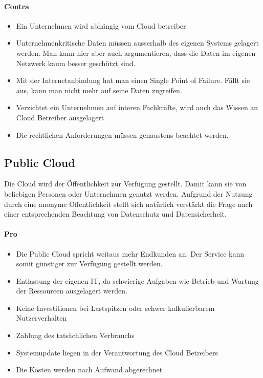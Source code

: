 \paragraph{Contra}
\begin{itemize}
	\item Ein Unternehmen wird abhängig vom Cloud betreiber
	\item Unternehmenkritische Daten müssen ausserhalb des eigenen Systems gelagert werden. Man kann hier aber auch argumentieren, dass die Daten im eigenen Netzwerk kaum besser geschützt sind.
	\item Mit der Internetanbindung hat man einen Single Point of Failure. Fällt sie aus, kann man nicht mehr auf seine Daten zugreifen.
	\item Verzichtet ein Unternehmen auf interen Fachkräfte, wird auch das Wissen an Cloud Betreiber ausgelagert
	\item Die rechtlichen Anforderungen müssen genaustens beachtet werden.
\end{itemize}


\subsection{Public Cloud}
Die Cloud wird der Öffentlichkeit zur Verfügung gestellt. Damit kann sie von beliebigen Personen oder Unternehmen genutzt werden. Aufgrund der Nutzung durch eine anonyme Öffentlichkeit stellt sich natürlich verstärkt die Frage nach einer entsprechenden Beachtung von Datenschutz und Datensicherheit.
\paragraph{Pro}
\begin{itemize}
	\item Die Public Cloud spricht weitaus mehr Endkunden an. Der Service kann somit günstiger zur Verfügung gestellt werden.
	\item Entlastung der eigenen IT, da schwierige Aufgaben wie Betrieb und Wartung der Ressourcen ausgelagert werden.
	\item Keine Investitionen bei Lastspitzen oder schwer kalkulierbarem Nutzerverhalten
	\item Zahlung des tatsächlichen Verbrauchs
	\item Systemupdate liegen in der Verantwortung des Cloud Betreibers
	\item Die Kosten werden nach Aufwand abgerechnet
\end{itemize}

